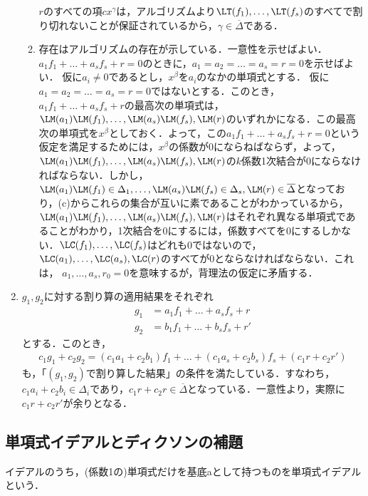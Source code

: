 \begin{enumerate}[label=(問題\arabic*)]
\begin{enumerate}[label=(\alph*)]
$r$のすべての項$cx^\gamma$は，アルゴリズムより$\LT(f_1),\dots,\LT(f_s)$のすべてで割り切れないことが保証されているから，$\gamma \in \overline \Delta$である．
 \item
存在はアルゴリズムの存在が示している．一意性を示せばよい．$a_1 f_1 + \dots + a_s f_s +r = 0$のときに，$a_1=a_2=\dots=a_s = r=0$を示せばよい．
仮に$a_i\neq 0$であるとし，$x^\beta$を$a_i$のなかの単項式とする．
仮に$a_1=a_2=\dots=a_s=r=0$ではないとする．このとき，$a_1f_1 + \dots + a_s f_s +r$の最高次の単項式は，$\LM(a_1)\LM(f_1),\dots,\LM(a_s)\LM(f_s),\LM(r)$のいずれかになる．この最高次の単項式を$x^\beta$としておく．よって，この$a_1f_1 + \dots + a_s f_s + r=0$という仮定を満足するためには，$x^\beta$の係数が0にならねばならず，よって，$\LM(a_1)\LM(f_1),\dots,\LM(a_s)\LM(f_s),\LM(r)$の$k$係数1次結合が0にならなければならない．しかし，$\LM(a_1)\LM(f_1) \in \Delta_1,\dots,\LM(a_s)\LM(f_s)\in \Delta_s,\LM(r)\in \overline\Delta$となっており，(c)からこれらの集合が互いに素であることがわかっているから，$\LM(a_1)\LM(f_1),\dots, \LM(a_s)\LM(f_s),\LM(r)$はそれぞれ異なる単項式であることがわかり，1次結合を0にするには，係数すべてを0にするしかない．$\LC(f_1),\dots,\LC(f_s)$はどれも0ではないので，
$\LC(a_1),\dots,\LC(a_s),\LC(r)$のすべてが0とならなければならない．これは，
$a_1,\dots,a_s,r_0=0$を意味するが，背理法の仮定に矛盾する．
\end{enumerate}
 \item $g_1,g_2$に対する割り算の適用結果をそれぞれ
\begin{align}
 g_1 &= a_1 f_1 + \dots + a_s f_s + r\\
 g_2 & = b_1 f_1 + \dots + b_s f_s + r'
\end{align}
とする．このとき，
\begin{align}
 c_1 g_1 + c_2 g_2 = (c_1 a_1 + c_2 b_1)f_1 + \dots + (c_1 a_s + c_2 b_s)f_s + (c_1 r+c_2 r')
\end{align}
も，「$(g_1,g_2)$で割り算した結果」の条件を満たしている．すなわち，
$c_1 a_i+c_2 b_i \in \Delta_i$であり，$c_1 r+c_2 r\in \overline \Delta$となっている．一意性より，実際に$c_1 r+ c_2 r'$が余りとなる．
\end{enumerate}

\subsection{単項式イデアルとディクソンの補題}
イデアルのうち，(係数1の)単項式だけを基底aとして持つものを単項式イデアルという．

